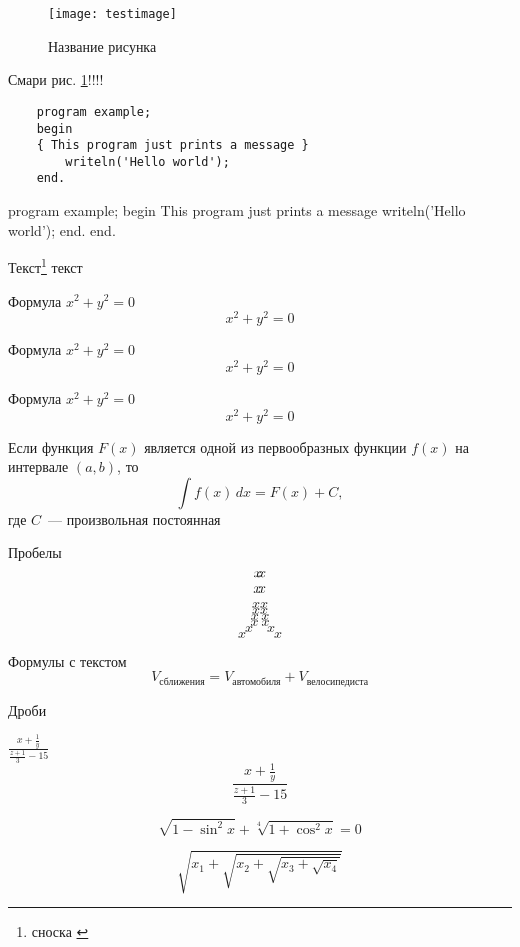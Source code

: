 \documentclass [a4paper,oneside,final,14pt]{extarticle}
\begin{document}
\begin{figure}[h]
	\centering
	\texttt{[image: testimage]}
	\caption{Название рисунка}
	\label{ris1}
\end{figure}

Смари рис. \ref{ris1}!!!!



\begin{verbatim}
	program example;
	begin
	{ This program just prints a message }
		writeln('Hello world');
	end.
\end{verbatim}

\begin{listing}[3]{1}
	program example;
	begin
	{ This program just prints a message }
		writeln('Hello world');
	end.
	end.
\end{listing}


Текст\footnote{сноска \label{my_footnote}} текст


\marginpar[\hfill\attentionpicture]{\attentionpicture}


Формула \begin{math} x^2 + y^2 = 0 \end{math} 
\begin{displaymath}
	x^2 + y^2 = 0	
\end{displaymath}

Формула \( x^2 + y^2 = 0 \) 
\[ x^2 + y^2 = 0\]

Формула $ x^2 + y^2 = 0$ $$ x^2 + y^2 = 0 $$

Если функция \( F(x) \) является одной из первообразных функции \( f(x) \) на интервале
\( (a, b) \), то
\[\int f(x)\,dx=F(x)+C,\]
где \(C\)~--- произвольная постоянная

Пробелы
\[ x\negthickspace x \]
\[ x\negmedspace x \]
\[ x\!x \]
\[ xx \]
\[ x\,x \]
\[ x\:x \]
\[ x\quad x \]
\[ x\qquad x \]

Формулы с текстом
\[ V_\text{сближения} = V_\text{автомобиля} + V_\text{велосипедиста} \]

Дроби

\( \frac{x+\frac{1}{y}}{\frac{z+1}{3}-15} \)
\[ \frac{x+\frac{1}{y}}{\frac{z+1}{3}-15} \]

\[ \sqrt{1 - \sin^2 x} + \sqrt[4]{1 + \cos^2 x} = 0 \]

\[ \sqrt{x_1 + \sqrt{x_2 + \sqrt{x_3 + \sqrt {x_4}}}} \]
\end{document}
